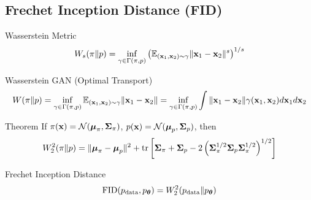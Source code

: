 \documentclass{beamer}
\begin{document}
\subsection{Frechet Inception Distance (FID)}
\begin{frame}{Wasserstein Metric}
	\vspace{-0.2cm}
	\[
		W_s(\pi \| p) = \inf_{\gamma \in \Gamma(\pi, p)} \left(\mathbb{E}_{(\mathbf{x}_1, \mathbf{x}_2) \sim \gamma} \| \mathbf{x}_1 - \mathbf{x}_2 \|^s\right)^{1/s}
	\]
	\eqpause
	\vspace{-0.3cm}
	\begin{block}{Wasserstein GAN (Optimal Transport)}
		\vspace{-0.5cm}
		{\small
		\[
			W(\pi \| p) = \inf_{\gamma \in \Gamma(\pi, p)} \mathbb{E}_{(\mathbf{x}_1, \mathbf{x}_2) \sim \gamma} \| \mathbf{x}_1 - \mathbf{x}_2 \| =  \inf_{\gamma\in {\Gamma(\pi, p)}} \int { \| \mathbf{x}_1 - \mathbf{x}_2 \|} {\gamma (\mathbf{x}_1, \mathbf{x}_2)} d \mathbf{x}_1 d \mathbf{x}_2
		\]
		}
		\vspace{-0.5cm}
	\end{block}
	\eqpause
	\begin{block}{Theorem}
		If $\pi(\mathbf{x}) = \mathcal{N}(\boldsymbol{\mu}_\pi, \boldsymbol{\Sigma}_\pi)$, $p(\mathbf{x}) = \mathcal{N}(\boldsymbol{\mu}_p, \boldsymbol{\Sigma}_p)$, then
		\vspace{-0.2cm}
		\[
			W_2^2(\pi \| p) = \| \boldsymbol{\mu}_{\pi} - \boldsymbol{\mu}_{p}\|^2 + \text{tr} \left[ \boldsymbol{\Sigma}_{\pi} + \boldsymbol{\Sigma}_p - 2 \left(\boldsymbol{\Sigma}_{\pi}^{1/2} \boldsymbol{\Sigma}_p \boldsymbol{\Sigma}_{\pi}^{1/2} \right)^{1/2} \right]
		\]
		\vspace{-0.7cm}
	\end{block}
	\eqpause
	\begin{block}{Frechet Inception Distance}
		\vspace{-0.3cm}
		\[
			\mathrm{FID} (p_{\text{data}}, p_{\boldsymbol{\theta}}) =  W_2^2(p_{\text{data}} \| p_{\boldsymbol{\theta}})
		\]
		\vspace{-0.6cm}
	\end{block}
\end{frame}
\end{document}
